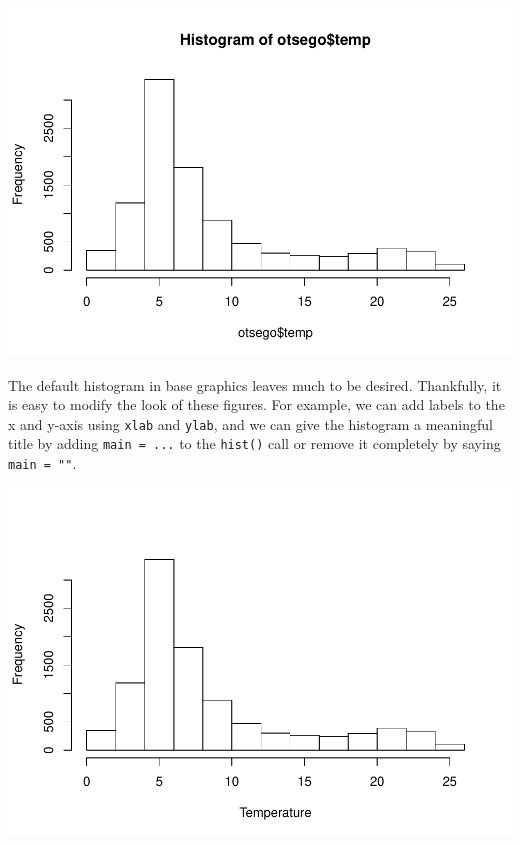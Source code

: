 \documentclass[
]{book}
\newenvironment{Shaded}{\begin{snugshade}}{\end{snugshade}}
\newcommand{\DataTypeTok}[1]{\textcolor[rgb]{0.13,0.29,0.53}{#1}}
\newcommand{\KeywordTok}[1]{\textcolor[rgb]{0.13,0.29,0.53}{\textbf{#1}}}
\newcommand{\NormalTok}[1]{#1}
\newcommand{\OperatorTok}[1]{\textcolor[rgb]{0.81,0.36,0.00}{\textbf{#1}}}
\newcommand{\StringTok}[1]{\textcolor[rgb]{0.31,0.60,0.02}{#1}}
\begin{document}
\includegraphics{worstr_files/figure-latex/unnamed-chunk-86-1.pdf}

The default histogram in base graphics leaves much to be desired. Thankfully, it is easy to modify the look of these figures. For example, we can add labels to the x and y-axis using \texttt{xlab} and \texttt{ylab}, and we can give the histogram a meaningful title by adding \texttt{main\ =\ ...} to the \texttt{hist()} call or remove it completely by saying \texttt{main\ =\ ""}.

\begin{Shaded}
\end{Shaded}

\includegraphics{worstr_files/figure-latex/unnamed-chunk-87-1.pdf}
\end{document}
